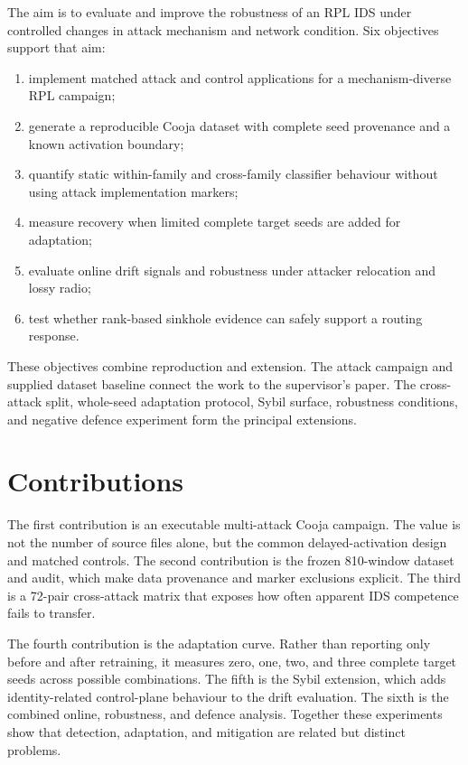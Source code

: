 The aim is to evaluate and improve the robustness of an RPL IDS under controlled changes in attack mechanism and network condition. Six objectives support that aim:
\begin{enumerate}
  \item implement matched attack and control applications for a mechanism-diverse RPL campaign;
  \item generate a reproducible Cooja dataset with complete seed provenance and a known activation boundary;
  \item quantify static within-family and cross-family classifier behaviour without using attack implementation markers;
  \item measure recovery when limited complete target seeds are added for adaptation;
  \item evaluate online drift signals and robustness under attacker relocation and lossy radio;
  \item test whether rank-based sinkhole evidence can safely support a routing response.
\end{enumerate}

These objectives combine reproduction and extension. The attack campaign and supplied dataset baseline connect the work to the supervisor's paper. The cross-attack split, whole-seed adaptation protocol, Sybil surface, robustness conditions, and negative defence experiment form the principal extensions.

\section{Contributions}

The first contribution is an executable multi-attack Cooja campaign. The value is not the number of source files alone, but the common delayed-activation design and matched controls. The second contribution is the frozen 810-window dataset and audit, which make data provenance and marker exclusions explicit. The third is a 72-pair cross-attack matrix that exposes how often apparent IDS competence fails to transfer.

The fourth contribution is the adaptation curve. Rather than reporting only before and after retraining, it measures zero, one, two, and three complete target seeds across possible combinations. The fifth is the Sybil extension, which adds identity-related control-plane behaviour to the drift evaluation. The sixth is the combined online, robustness, and defence analysis. Together these experiments show that detection, adaptation, and mitigation are related but distinct problems.

